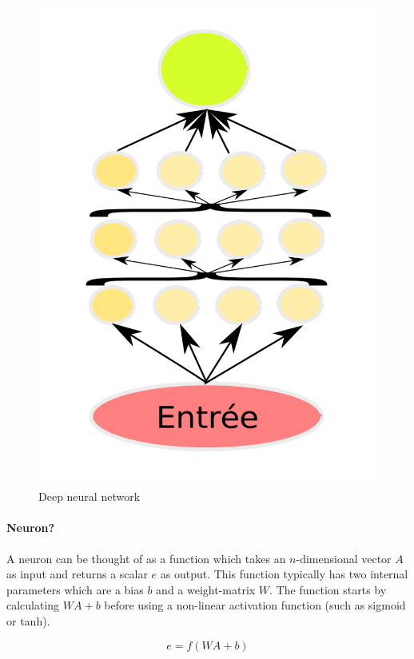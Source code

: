 \documentclass[conference]{IEEEtran}
\begin{document}
\begin{figure}[!tbp]
\begin{minipage}[b]{0.225\textwidth}
    \includegraphics[width=\textwidth]{Deep}
    \caption{Deep neural network}
  \end{minipage}
\end{figure}


\paragraph{Neuron?}
A neuron can be thought of as a function which takes an $n$-dimensional vector
$A$ as input and returns a scalar $e$ as output. This function typically has two
internal parameters which are a bias $b$ and a weight-matrix $W$. The function
starts by calculating $WA+b$ before using a non-linear activation function (such
as sigmoid or tanh).

\begin{equation}
  e=f(WA+b)
\end{equation}
\end{document}
